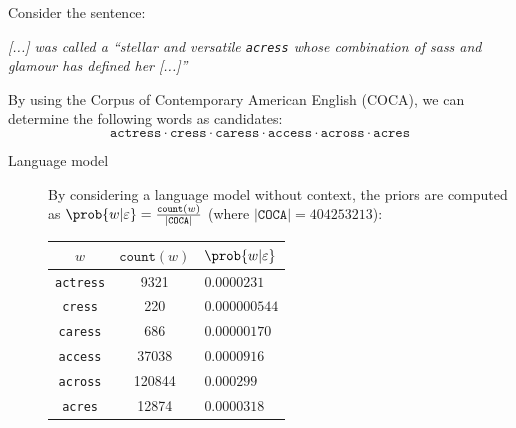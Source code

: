 \begin{example}
    Consider the sentence:
    \begin{center}
        \parbox{0.65\linewidth}{
            \textit{\textnormal{[...]} was called a ``stellar and versatile \texttt{acress} whose combination of sass and glamour has defined her \textnormal{[...]}''}
        }
    \end{center}
    By using the Corpus of Contemporary American English (COCA), we can determine the following words as candidates:
    \[
        \texttt{actress} \cdot \texttt{cress} \cdot \texttt{caress} \cdot \texttt{access} \cdot \texttt{across} \cdot \texttt{acres}
    \]

    \begin{description}
        \item[Language model] By considering a language model without context, the priors are computed as $\prob{w | \varepsilon} = \frac{\texttt{count}(w)}{\vert \texttt{COCA} \vert}$ (where $\vert \texttt{COCA} \vert = \num{404253213}$):
        \begin{table}[H]
            \centering
            \footnotesize
            \begin{tabular}{ccl}
                \toprule
                $w$ & $\texttt{count}(w)$ & $\prob{w | \varepsilon}$ \\
                \midrule
                \texttt{actress}    & \num{9321}    & $0.0000231$   \\
                \texttt{cress}      & \num{220}     & $0.000000544$ \\
                \texttt{caress}     & \num{686}     & $0.00000170$  \\
                \texttt{access}     & \num{37038}   & $0.0000916$   \\
                \texttt{across}     & \num{120844}  & $0.000299$    \\
                \texttt{acres}      & \num{12874}   & $0.0000318$   \\
                \bottomrule
            \end{tabular}
        \end{table}


\end{description}
\end{example}
